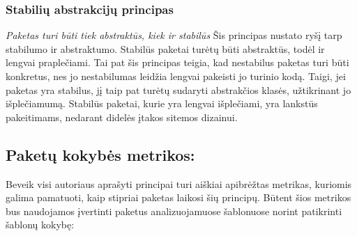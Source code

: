 \subsubsection{Stabilių abstrakcijų principas}
\textit{Paketas turi būti tiek abstraktūs, kiek ir stabilūs}
Šis principas nustato ryšį tarp stabilumo ir abstraktumo.
Stabilūs paketai turėtų būti abstraktūs, todėl ir lengvai praplečiami.
Tai pat šis principas teigia, kad nestabilus paketas turi būti konkretus, nes jo nestabilumas leidžia lengvai pakeisti jo turinio kodą.
Taigi, jei paketas yra stabilus, jį taip pat turėtų sudaryti abstrakčios klasės, užtikrinant jo išplečiamumą.
Stabilūs paketai, kurie yra lengvai išplečiami, yra lankstūs pakeitimams, nedarant didelės įtakos sitemos dizainui\cite{AgileSoftwareDevelopment}.

\subsection{Paketų kokybės metrikos:}
Beveik visi autoriaus aprašyti principai turi aiškiai apibrėžtas metrikas, kuriomis galima pamatuoti, kaip stipriai paketas laikosi šių principų.
Būtent šios metrikos bus naudojamos įvertinti paketus analizuojamuose šablonuose norint patikrinti šablonų kokybę:

